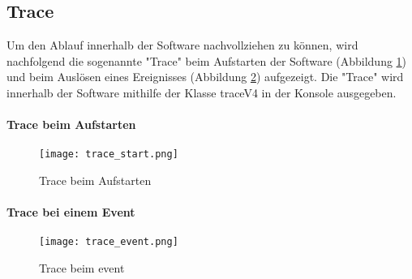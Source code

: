 \subsection{Trace} \label{trace}
Um den Ablauf innerhalb der Software nachvollziehen zu können, wird nachfolgend die sogenannte "Trace" beim Aufstarten der Software (Abbildung \ref{fig:tracestart}) und beim Auslösen eines Ereignisses (Abbildung \ref{fig:traceevent}) aufgezeigt. Die "Trace" wird innerhalb der Software mithilfe der Klasse traceV4 in der Konsole ausgegeben.

\paragraph{Trace beim Aufstarten}
 
 \begin{figure}[H]
	\centering
	\texttt{[image: trace\_start.png]}
	\caption{Trace beim Aufstarten}
	\label{fig:tracestart}
\end{figure} 

\newpage

\paragraph{Trace bei einem Event}

\begin{figure}[H]
	\centering
	\texttt{[image: trace\_event.png]}
	\caption{Trace beim event}
	\label{fig:traceevent}
\end{figure} 

\newpage